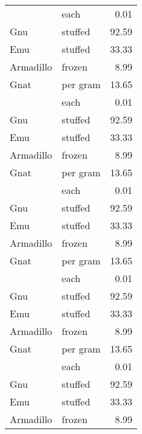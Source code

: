 {\begin{center}
\begin{xtabular}{llr}
          & each     & 0.01  \\
Gnu       & stuffed  & 92.59 \\
Emu       & stuffed  & 33.33 \\
Armadillo & frozen   & 8.99  \\
Gnat      & per gram & 13.65 \\
          & each     & 0.01  \\
Gnu       & stuffed  & 92.59 \\
Emu       & stuffed  & 33.33 \\
Armadillo & frozen   & 8.99  \\
Gnat      & per gram & 13.65 \\
          & each     & 0.01  \\
Gnu       & stuffed  & 92.59 \\
Emu       & stuffed  & 33.33 \\
Armadillo & frozen   & 8.99  \\
Gnat      & per gram & 13.65 \\
          & each     & 0.01  \\
Gnu       & stuffed  & 92.59 \\
Emu       & stuffed  & 33.33 \\
Armadillo & frozen   & 8.99  \\
Gnat      & per gram & 13.65 \\
          & each     & 0.01  \\
Gnu       & stuffed  & 92.59 \\
Emu       & stuffed  & 33.33 \\
Armadillo & frozen   & 8.99  \\
\bottomrule
\end{xtabular}
\end{center}
} 
